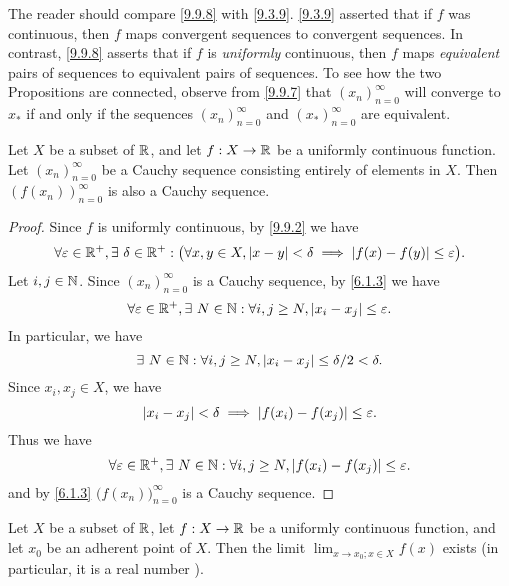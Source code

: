 \begin{rmk}\label{9.9.9}
  The reader should compare \cref{9.9.8} with \cref{9.3.9}.
  \cref{9.3.9} asserted that if \(f\) was continuous, then \(f\) maps convergent sequences to convergent sequences.
  In contrast, \cref{9.9.8} asserts that if \(f\) is \emph{uniformly} continuous, then \(f\) maps \emph{equivalent} pairs of sequences to equivalent pairs of sequences.
  To see how the two Propositions are connected, observe from \cref{9.9.7} that \((x_n)_{n = 0}^\infty\) will converge to \(x_*\) if and only if the sequences \((x_n)_{n = 0}^\infty\) and \((x_*)_{n = 0}^\infty\) are equivalent.
\end{rmk}

\setcounter{thm}{11}
\begin{prop}\label{9.9.12}
  Let \(X\) be a subset of \(\mathbb{R}\), and let \(f : X \to \mathbb{R}\) be a uniformly continuous function.
  Let \((x_n)_{n = 0}^\infty\) be a Cauchy sequence consisting entirely of elements in \(X\).
  Then \((f(x_n))_{n = 0}^\infty\) is also a Cauchy sequence.
\end{prop}

\begin{proof}
  Since \(f\) is uniformly continuous, by \cref{9.9.2} we have
  \[
    \forall \varepsilon \in \mathbb{R}^+, \exists\ \delta \in \mathbb{R}^+ : \big(\forall x, y \in X, \left\lvert x - y\right\rvert < \delta \implies \left\lvert f(x) - f(y)\right\rvert \leq \varepsilon\big).
  \]
  Let \(i, j \in \mathbb{N}\).
  Since \((x_n)_{n = 0}^\infty\) is a Cauchy sequence, by \cref{6.1.3} we have
  \[
    \forall \varepsilon \in \mathbb{R}^+, \exists\ N \in \mathbb{N} : \forall i, j \geq N, \left\lvert x_i - x_j\right\rvert \leq \varepsilon.
  \]
  In particular, we have
  \[
    \exists\ N \in \mathbb{N} : \forall i, j \geq N, \left\lvert x_i - x_j\right\rvert \leq \delta / 2 < \delta.
  \]
  Since \(x_i, x_j \in X\), we have
  \[
    \left\lvert x_i - x_j\right\rvert < \delta \implies \left\lvert f(x_i) - f(x_j)\right\rvert \leq \varepsilon.
  \]
  Thus we have
  \[
    \forall \varepsilon \in \mathbb{R}^+, \exists\ N \in \mathbb{N} : \forall i, j \geq N, \left\lvert f(x_i) - f(x_j)\right\rvert \leq \varepsilon.
  \]
  and by \cref{6.1.3} \(\big(f(x_n)\big)_{n = 0}^\infty\) is a Cauchy sequence.
\end{proof}

\setcounter{thm}{13}
\begin{cor}\label{9.9.14}
  Let \(X\) be a subset of \(\mathbb{R}\), let \(f : X \to \mathbb{R}\) be a uniformly continuous function, and let \(x_0\) be an adherent point of \(X\).
  Then the limit \(\lim_{x \to x_0 ; x \in X} f(x)\) exists
  (in particular, it is a real number ).
\end{cor}

